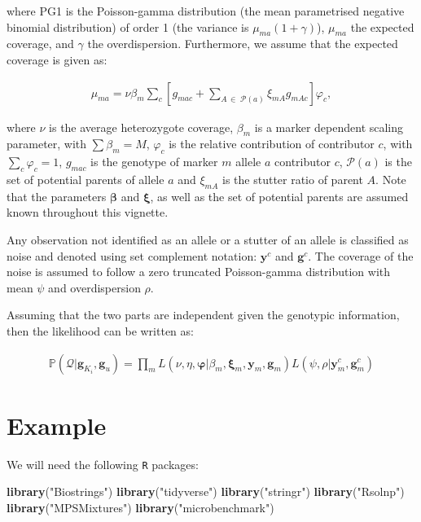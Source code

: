 \documentclass[]{article}
\newenvironment{Shaded}{\begin{snugshade}}{\end{snugshade}}
\newcommand{\KeywordTok}[1]{\textcolor[rgb]{0.13,0.29,0.53}{\textbf{#1}}}
\newcommand{\StringTok}[1]{\textcolor[rgb]{0.31,0.60,0.02}{#1}}
\newcommand{\NormalTok}[1]{#1}
\newcommand{\bs}[1]{\ensuremath{\boldsymbol{#1}}}
\newcommand{\mc}[1]{\ensuremath{\mathcal{#1}}}
\newcommand{\mcg}{\ensuremath{g}}
\newcommand{\p}[1]{\ensuremath{\mathbb{P}\left(#1\right)}}
\begin{document}
where PG1 is the Poisson-gamma distribution (the mean parametrised
negative binomial distribution) of order 1 (the variance is
\(\mu_{ma} (1 + \gamma)\)), \(\mu_{ma}\) the expected coverage, and
\(\gamma\) the overdispersion. Furthermore, we assume that the expected
coverage is given as:

\begin{align*}
\mu_{ma} = \nu \beta_m \sum_{c} \left[g_{mac} + \sum_{A\,\in\;\mc P(a)} \xi_{mA} g_{mAc} \right]\varphi_c,
\end{align*}

where \(\nu\) is the average heterozygote coverage, \(\beta_m\) is a
marker dependent scaling parameter, with \(\sum \beta_m = M\),
\(\varphi_c\) is the relative contribution of contributor \(c\), with
\(\sum_c \varphi_c = 1\), \(g_{mac}\) is the genotype of marker \(m\)
allele \(a\) contributor \(c\), \(\mc P(a)\) is the set of potential
parents of allele \(a\) and \(\xi_{mA}\) is the stutter ratio of parent
\(A\). Note that the parameters \(\bs\beta\) and \(\bs\xi\), as well as
the set of potential parents are assumed known throughout this vignette.

Any observation not identified as an allele or a stutter of an allele is
classified as noise and denoted using set complement notation:
\(\bs y^c\) and \(\bs g^c\). The coverage of the noise is assumed to
follow a zero truncated Poisson-gamma distribution with mean \(\psi\)
and overdispersion \(\rho\).

Assuming that the two parts are independent given the genotypic
information, then the likelihood can be written as:

\begin{align}\label{eq:likelihoodModel}
\p{\bs{\mc Q}|\bs \mcg_{K_i}, \bs \mcg_{u}} = \prod_m L(\nu, \eta, \bs \varphi | \beta_m, \bs\xi_m, \bs y_m, \bs g_m) L(\psi, \rho | \bs y^c_m, \bs g^c_m)
\end{align}

\section{Example}\label{example}

We will need the following \texttt{R} packages:

\begin{Shaded}
\begin{Highlighting}[]
\KeywordTok{library}\NormalTok{(}\StringTok{"Biostrings"}\NormalTok{)}
\KeywordTok{library}\NormalTok{(}\StringTok{"tidyverse"}\NormalTok{)}
\KeywordTok{library}\NormalTok{(}\StringTok{"stringr"}\NormalTok{)}
\KeywordTok{library}\NormalTok{(}\StringTok{"Rsolnp"}\NormalTok{)}
\KeywordTok{library}\NormalTok{(}\StringTok{"MPSMixtures"}\NormalTok{)}
\KeywordTok{library}\NormalTok{(}\StringTok{"microbenchmark"}\NormalTok{)}
\end{Highlighting}
\end{Shaded}
\end{document}
